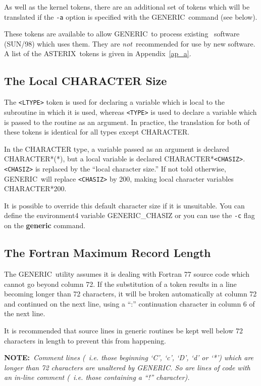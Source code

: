 \documentclass[twoside,11pt,nolof]{starlink}
\providecommand{\ASTERIX}{{\footnotesize ASTERIX}\normalsize}
\providecommand{\ASTERIXref}{\xref{\ASTERIX}{sun98}{}}
\providecommand{\GENERIC}{{\footnotesize GENERIC}\normalsize}
\providecommand{\latexelsehtml}[2]{#1}
\begin{document}
As well as the kernel tokens, there are an additional set of
tokens which will be translated if the \texttt{-a} option is specified
with the \GENERIC\ command (see below).

These tokens are available to allow \GENERIC\ to process existing
\ASTERIXref\ software (SUN/98) which uses them.
They are \emph{not}\ recommended for use by new software.
A list of the \ASTERIX\ tokens is given in
\latexelsehtml{Appendix~\ref{ap_a}}{the
\htmlref{token translations}{ap_a}}.

\subsection{The Local CHARACTER Size}

The \verb+<LTYPE>+ token is used for declaring a variable which is local
to the subroutine in which it is used, whereas \verb+<TYPE>+ is used
to declare a variable which is passed to the routine as an argument.
In practice, the translation for both of these tokens is identical
for all types except CHARACTER.

In the CHARACTER type, a variable passed as an argument is declared
CHARACTER*(*), but a local variable is declared CHARACTER*\verb+<CHASIZ>+.
\verb+<CHASIZ>+ is replaced by the ``local character size.''
If not told otherwise, \GENERIC\ will replace \verb+<CHASIZ>+ by 200,
making local character variables CHARACTER*200.

It is possible to override this default character size
if it is unsuitable.  You can define the environment4 variable
GENERIC\_CHASIZ or you can use the \texttt{-c} flag on the
\textbf{generic} command.

\subsection{The Fortran Maximum Record Length}

The \GENERIC\ utility assumes it is dealing with Fortran 77
source code which cannot go beyond column 72.
If the substitution of a token results in a line becoming longer
than 72 characters, it will be broken automatically at column 72
and continued on the next line, using a ``:'' continuation character
in column 6 of the next line.

It is recommended that source lines in generic routines be kept
well below 72 characters in length to prevent this from happening.

\textbf{NOTE:}~\textit{Comment lines (~{\rm i.e.} those beginning `C', `c', `D', `d'
or `*') which are longer than 72 characters are unaltered by \GENERIC.
So are lines of code with an in-line comment (~\emph{i.e.} those containing
a ``!'' character).}
\end{document}
